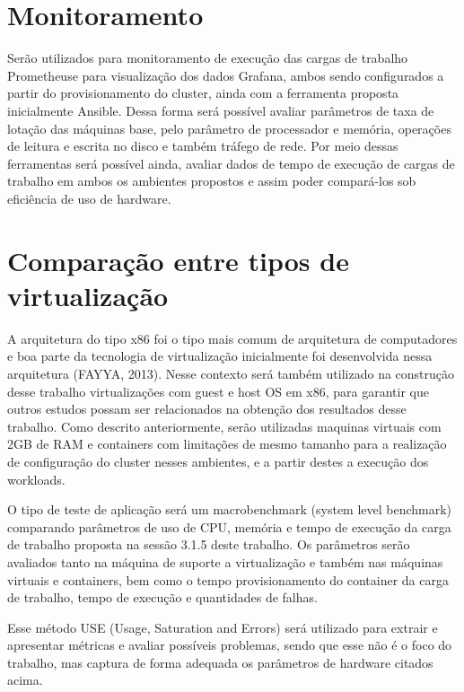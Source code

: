 \section{Monitoramento}

Serão utilizados para monitoramento de execução das cargas de trabalho Prometheus\textregistered  e para visualização dos dados Grafana\textregistered, ambos sendo configurados a partir do provisionamento do cluster, ainda com a ferramenta proposta inicialmente Ansible\textregistered. Dessa forma será possível avaliar parâmetros de taxa de lotação das máquinas base, pelo parâmetro de processador e memória, operações de leitura e escrita no disco e também tráfego de rede. Por meio dessas ferramentas será possível ainda, avaliar dados de tempo de execução de cargas de trabalho em ambos os ambientes propostos e assim poder compará-los sob eficiência de uso de hardware.

\section{Comparação entre tipos de virtualização}

A arquitetura do tipo x86 foi o tipo mais comum de arquitetura de computadores e boa parte da tecnologia de virtualização inicialmente foi desenvolvida nessa arquitetura (FAYYA, 2013). Nesse contexto será também utilizado na construção desse trabalho virtualizações com guest e host OS  em x86, para garantir que outros estudos possam ser relacionados na obtenção dos resultados desse trabalho.
Como descrito anteriormente, serão utilizadas maquinas virtuais com 2GB de RAM e containers com limitações de mesmo tamanho para a realização de configuração do cluster nesses ambientes, e a partir destes a execução dos workloads.

O tipo de teste de aplicação será um macrobenchmark (system level benchmark) \cite{huge2008,scheepers2014virtualization} comparando parâmetros de uso de CPU, memória e tempo de execução da carga de trabalho proposta na sessão 3.1.5 deste trabalho. Os parâmetros serão avaliados  tanto na máquina de suporte a virtualização e também nas máquinas virtuais e containers, bem como o tempo provisionamento do container da carga de trabalho, tempo de execução e quantidades de falhas.

Esse método USE (Usage, Saturation and Errors) \cite{greg2022} será utilizado para extrair e apresentar métricas e avaliar possíveis problemas, sendo que esse não é o foco do trabalho, mas captura de forma adequada os parâmetros de hardware citados acima.

